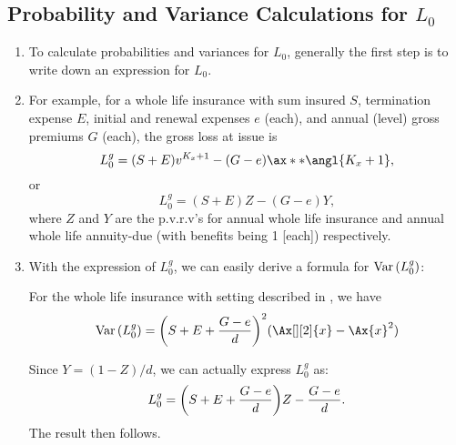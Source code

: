 \subsection{Probability and Variance Calculations for \(L_0\)}
\begin{enumerate}
\item To calculate probabilities and variances for \(L_0\), generally the
first step is to write down an expression for \(L_0\).

\item \label{it:wl-gross-loss-expr}
For example, for a whole life insurance with sum insured
\(S\), termination expense \(E\), initial and renewal expenses \(e\) (each),
and annual (level) gross premiums \(G\) (each), the gross loss at issue is
\[
L_0^g=(S+E)v^{K_x+1}-(G-e)\ax**{\angl{K_x+1}},
\]
or
\[
L_0^g=(S+E)Z-(G-e)Y,
\]
where \(Z\) and \(Y\) are the p.v.r.v's for annual whole life insurance and
annual whole life annuity-due (with benefits being 1 [each]) respectively.

\item With the expression of \(L_0^g\), we can easily derive a formula for
\(\operatorname{Var}\qty(L_0^g)\): 
\begin{proposition}
\label{prp:wl-gross-loss-var-fmla}
For the whole life insurance with setting described in
, we have
\[
\vari{L_0^g}=\qty(S+E+\frac{G-e}{d})^{2}(\Ax[][2]{x}-\Ax{x}^2)
\]
\end{proposition}
\begin{pf}
Since \(Y=(1-Z)/d\), we can actually express \(L_0^g\) as:
\[
L_0^g=\qty(S+E+\frac{G-e}{d})Z-\frac{G-e}{d}.
\]
The result then follows.
\end{pf}


\end{enumerate}
